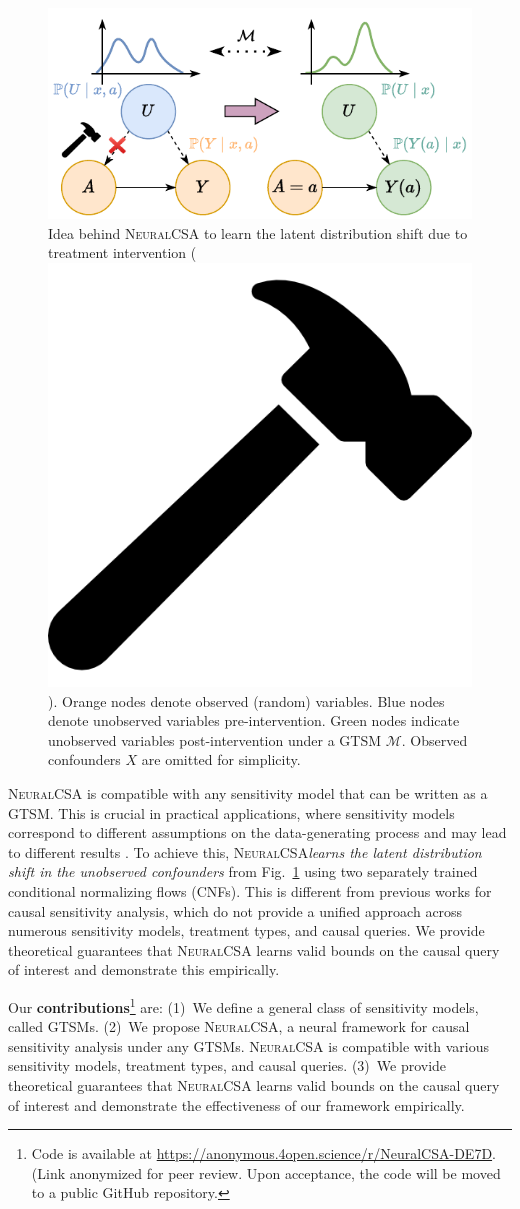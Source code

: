 \documentclass{article} %
\newcommand{\frameworkname}{\textsc{NeuralCSA}\xspace}
\newcommand{\hammer}{\includegraphics[scale=0.018]{figures/hammer.png}}
\theoremstyle{definition}
\theoremstyle{plain}
\begin{document}
\begin{figure}
  \centering
  \vspace{-0.5cm}
  \includegraphics[width=1\linewidth]{figures/dist_shift.pdf}
  \caption{Idea behind \frameworkname to learn the latent distribution shift due to treatment intervention (\hammer). Orange nodes denote observed (random) variables. Blue nodes denote unobserved variables pre-intervention. Green nodes indicate unobserved variables post-intervention under a GTSM $\mathcal{M}$. Observed confounders $X$ are omitted for simplicity.}
  \label{fig:dist_shift_sketch}
  \vspace{-0.5cm}
\end{figure}
\frameworkname is compatible with any sensitivity model that can be written as a GTSM. This is crucial in practical applications, where sensitivity models correspond to different assumptions on the data-generating process and may lead to different results \citep{Yin.2022}.
To achieve this, \frameworkname \emph{learns the latent distribution shift in the unobserved confounders} from Fig.~\ref{fig:dist_shift_sketch} using two separately trained conditional normalizing flows (CNFs). This is different from previous works for causal sensitivity analysis, which do not provide a unified approach across numerous sensitivity models, treatment types, and causal queries. We provide theoretical guarantees that \frameworkname learns valid bounds on the causal query of interest and demonstrate this empirically.

Our \textbf{contributions}\insert\footins{\pdfrunninglinkoff}\footnote{Code is available at \href{https://anonymous.4open.science/r/NeuralCSA-DE7D}{https://anonymous.4open.science/r/NeuralCSA-DE7D}. (Link anonymized for peer review. Upon acceptance, the code will be moved to a public GitHub repository.}\insert\footins{\pdfrunninglinkon} are: (1)~We define a general class of sensitivity models, called GTSMs. (2)~We propose \frameworkname, a neural framework for causal sensitivity analysis under any GTSMs. \frameworkname is compatible with various sensitivity models, treatment types, and causal queries. (3)~We provide theoretical guarantees that \frameworkname learns valid bounds on the causal query of interest and demonstrate the effectiveness of our framework empirically. 
\end{document}
